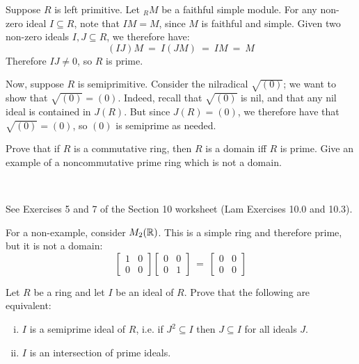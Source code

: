 \begin{pf}
	Suppose $R$ is left primitive. Let $_{R}M$ be a faithful simple module.
	For any non-zero ideal $I\subseteq R$, note that $IM=M$, since $M$ is
	faithful and simple.
	Given two non-zero ideals $I,J\subseteq R$, we therefore have:
	\begin{equation*}
		(IJ)M \ = \ I(JM) \ = \ IM \ = \ M
	\end{equation*}
	Therefore $IJ\neq0$, so $R$ is prime.

	Now, suppose $R$ is semiprimitive.
	Consider the nilradical $\sqrt{(0)}$; we want to show that $\sqrt{(0)}=(0)$.
	Indeed, recall that $\sqrt{(0)}$ is nil, and that any nil ideal is
	contained in $J(R)$.
	But since $J(R)=(0)$, we therefore have that $\sqrt{(0)}=(0)$, so
	$(0)$ is semiprime as needed.
\end{pf}


\nq
\begin{exr}
	Prove that if $R$ is a commutative ring, then
	$R$ is a domain iff $R$ is prime.
	Give an example of a noncommutative prime ring which is not a domain.
\end{exr} \

\begin{pf}
	See Exercises 5 and 7 of the Section 10 worksheet (Lam Exercises 10.0 and 10.3).

	For a non-example, consider $M_{2}(\mathbb{R})$.
	This is a simple ring and therefore prime, but it is not a domain:
	\begin{equation*}
		\begin{bmatrix} 1 & 0 \\ 0 & 0 \end{bmatrix}
		\begin{bmatrix} 0 & 0 \\ 0 & 1 \end{bmatrix}
		\ = \
		\begin{bmatrix} 0 & 0 \\ 0 & 0 \end{bmatrix}
	\end{equation*}
\end{pf}


\nq
\begin{exr}[title=secretly part of Theorem 10.11]
	Let $R$ be a ring and let $I$ be an ideal of $R$.
	Prove that the following are equivalent: \vspace{-0.2in}
	\begin{enumerate}[i)]
		\item $I$ is a semiprime ideal of $R$, i.e. if $J^2\subseteq I$
			then $J\subseteq I$ for all ideals $J$.
		\item $I$ is an intersection of prime ideals.
	\end{enumerate}
\end{exr} \

